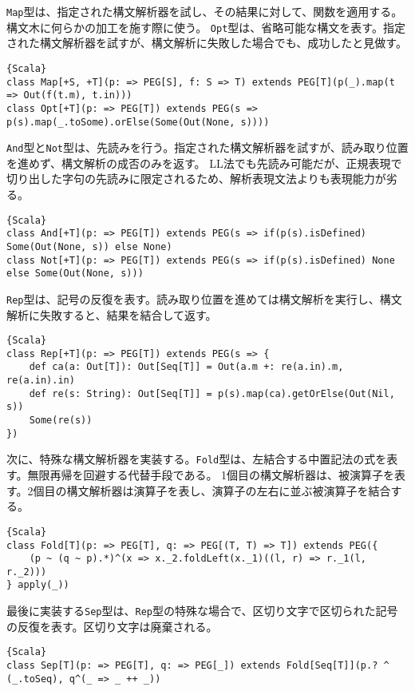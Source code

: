 \documentclass[10pt,a4paper]{book}
\begin{document}
\texttt{Map}型は、指定された構文解析器を試し、その結果に対して、関数を適用する。構文木に何らかの加工を施す際に使う。
\texttt{Opt}型は、省略可能な構文を表す。指定された構文解析器を試すが、構文解析に失敗した場合でも、成功したと見做す。

\begin{Verbatim}{Scala}
class Map[+S, +T](p: => PEG[S], f: S => T) extends PEG[T](p(_).map(t => Out(f(t.m), t.in)))
class Opt[+T](p: => PEG[T]) extends PEG(s => p(s).map(_.toSome).orElse(Some(Out(None, s))))
\end{Verbatim}

\texttt{And}型と\texttt{Not}型は、先読みを行う。指定された構文解析器を試すが、読み取り位置を進めず、構文解析の成否のみを返す。
LL法でも先読み可能だが、正規表現で切り出した字句の先読みに限定されるため、解析表現文法よりも表現能力が劣る。

\begin{Verbatim}{Scala}
class And[+T](p: => PEG[T]) extends PEG(s => if(p(s).isDefined) Some(Out(None, s)) else None)
class Not[+T](p: => PEG[T]) extends PEG(s => if(p(s).isDefined) None else Some(Out(None, s)))
\end{Verbatim}

\texttt{Rep}型は、記号の反復を表す。読み取り位置を進めては構文解析を実行し、構文解析に失敗すると、結果を結合して返す。

\begin{Verbatim}{Scala}
class Rep[+T](p: => PEG[T]) extends PEG(s => {
	def ca(a: Out[T]): Out[Seq[T]] = Out(a.m +: re(a.in).m, re(a.in).in)
	def re(s: String): Out[Seq[T]] = p(s).map(ca).getOrElse(Out(Nil, s))
	Some(re(s))
})
\end{Verbatim}

次に、特殊な構文解析器を実装する。\texttt{Fold}型は、左結合する中置記法の式を表す。無限再帰を回避する代替手段である。
1個目の構文解析器は、被演算子を表す。2個目の構文解析器は演算子を表し、演算子の左右に並ぶ被演算子を結合する。

\begin{Verbatim}{Scala}
class Fold[T](p: => PEG[T], q: => PEG[(T, T) => T]) extends PEG({
	(p ~ (q ~ p).*)^(x => x._2.foldLeft(x._1)((l, r) => r._1(l, r._2)))
} apply(_))
\end{Verbatim}

最後に実装する\texttt{Sep}型は、\texttt{Rep}型の特殊な場合で、区切り文字で区切られた記号の反復を表す。区切り文字は廃棄される。

\begin{Verbatim}{Scala}
class Sep[T](p: => PEG[T], q: => PEG[_]) extends Fold[Seq[T]](p.? ^ (_.toSeq), q^(_ => _ ++ _))
\end{Verbatim}
\end{document}
